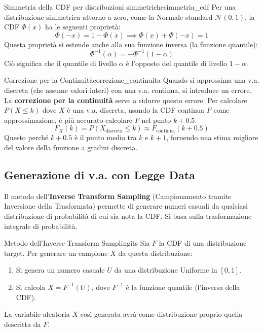 \begin{nota}{Simmetria della CDF per distribuzioni simmetriche}{simmetria_cdf}
Per una distribuzione simmetrica attorno a zero, come la Normale standard \( \mathcal{N}(0,1) \), la CDF \( \Phi(x) \) ha le seguenti proprietà:
\[
\Phi(-x) = 1 - \Phi(x) \implies \Phi(x) + \Phi(-x) = 1
\]
Questa proprietà si estende anche alla sua funzione inversa (la funzione quantile):
\[
\Phi^{-1}(\alpha) = - \Phi^{-1}(1-\alpha)
\]
Ciò significa che il quantile di livello \( \alpha \) è l'opposto del quantile di livello \( 1-\alpha \).
\end{nota}

\begin{nota}{Correzione per la Continuità}{correzione_continuita}
Quando si approssima una v.a. discreta (che assume valori interi) con una v.a. continua, si introduce un errore. La \textbf{correzione per la continuità} serve a ridurre questo errore.
Per calcolare \( P(X \le k) \) dove \( X \) è una v.a. discreta, usando la CDF continua \( F \) come approssimazione, è più accurato calcolare \( F \) nel punto \( k+0.5 \).
\[
F_X(k) = P(X_{\text{discreta}} \le k) \approx F_{\text{continua}}(k + 0.5)
\]
Questo perché \( k+0.5 \) è il punto medio tra \(k\) e \(k+1\), fornendo una stima migliore del valore della funzione a gradini discreta.
\end{nota}

\subsection{Generazione di v.a. con Legge Data}\label{ssec:generazione_va}
Il metodo dell'\textbf{Inverse Transform Sampling} (Campionamento tramite Inversione della Trasformata) permette di generare numeri casuali da qualsiasi distribuzione di probabilità di cui sia nota la CDF. Si basa sulla trasformazione integrale di probabilità.

\begin{proposizione}{Metodo dell'Inverse Transform Sampling}{its}
Sia \( F \) la CDF di una distribuzione target. Per generare un campione \( X \) da questa distribuzione:
\begin{enumerate}
    \item Si genera un numero casuale \( U \) da una distribuzione Uniforme in \( [0, 1] \).
    \item Si calcola \( X = F^{-1}(U) \), dove \( F^{-1} \) è la funzione quantile (l'inversa della CDF).
\end{enumerate}
La variabile aleatoria \( X \) così generata avrà come distribuzione proprio quella descritta da \( F \).
\end{proposizione}

